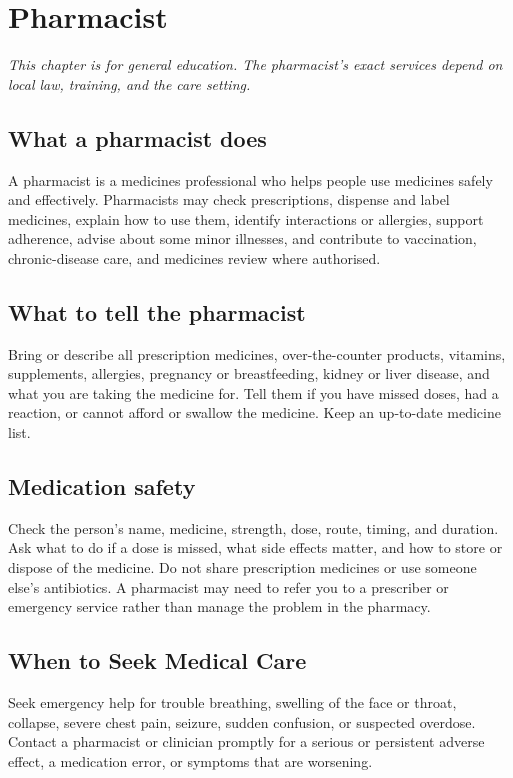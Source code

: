 \chapter{Pharmacist}

\medskip
\noindent\textit{This chapter is for general education. The pharmacist’s exact services depend on local law, training, and the care setting.}

\section*{What a pharmacist does}
A pharmacist is a medicines professional who helps people use medicines safely and effectively. Pharmacists may check prescriptions, dispense and label medicines, explain how to use them, identify interactions or allergies, support adherence, advise about some minor illnesses, and contribute to vaccination, chronic-disease care, and medicines review where authorised.

\section*{What to tell the pharmacist}
Bring or describe all prescription medicines, over-the-counter products, vitamins, supplements, allergies, pregnancy or breastfeeding, kidney or liver disease, and what you are taking the medicine for. Tell them if you have missed doses, had a reaction, or cannot afford or swallow the medicine. Keep an up-to-date medicine list.

\section*{Medication safety}
Check the person’s name, medicine, strength, dose, route, timing, and duration. Ask what to do if a dose is missed, what side effects matter, and how to store or dispose of the medicine. Do not share prescription medicines or use someone else’s antibiotics. A pharmacist may need to refer you to a prescriber or emergency service rather than manage the problem in the pharmacy.

\section*{When to Seek Medical Care}
Seek emergency help for trouble breathing, swelling of the face or throat, collapse, severe chest pain, seizure, sudden confusion, or suspected overdose. Contact a pharmacist or clinician promptly for a serious or persistent adverse effect, a medication error, or symptoms that are worsening.

